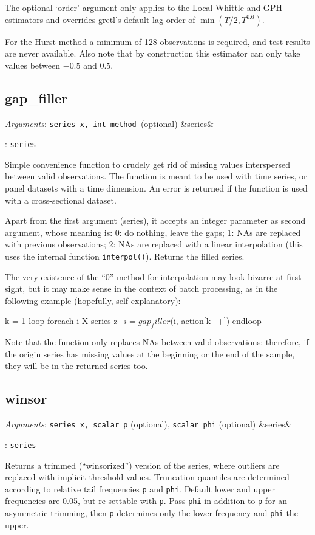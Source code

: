 \documentclass[11pt,english]{article}
\newcommand{\ArgRet}[2]{%
  {\it Arguments}: {#1}%
  \ifx&#2&%
  \else
  \par\smallskip\noindent {\it Return type}: \texttt{#2}
  \fi%
  \par\medskip\par%
  }
\begin{document}
The optional `order' argument only applies to the Local Whittle and GPH
estimators and overrides gretl's default lag order of $\min(T/2, T^{0.6})$.

For the Hurst method a minimum of 128 observations is required, and
test results are never available. Also note that by construction this
estimator can only take values between $-0.5$ and $0.5$.

\subsection{gap\_filler}

\ArgRet{\texttt{series x, int method }(optional)}{series}

Simple convenience function to crudely get rid of missing values
interspersed between valid observations. The function is meant to be
used with time series, or panel datasets with a time dimension. An
error is returned if the function is used with a cross-sectional
dataset.

Apart from the first argument (series), it accepts an integer
parameter as second argument, whose meaning is: 0: do nothing, leave
the gaps; 1: NAs are replaced with previous observations; 2: NAs are
replaced with a linear interpolation (this uses the internal function
\texttt{interpol()}). Returns the filled series.

The very existence of the ``0'' method for interpolation may look
bizarre at first sight, but it may make sense in the context of batch
processing, as in the following example (hopefully, self-explanatory):
\begin{code}
k = 1
loop foreach i X
   series z_$i = gap_filler($i, action[k++])
endloop
\end{code}

Note that the function only replaces NAs between valid observations;
therefore, if the origin series has missing values at the beginning or
the end of the sample, they will be in the returned series too.

\subsection{winsor}

\ArgRet{\texttt{series x, scalar p} (optional), \texttt{scalar
phi} (optional)}{series}

Returns a trimmed (``winsorized'') version
of the series, where outliers are replaced with implicit threshold
values. Truncation quantiles are determined according to relative
tail frequencies \texttt{p} and \texttt{phi}. Default lower and upper
frequencies are 0.05, but re-settable with \texttt{p}. Pass \texttt{phi}
in addition to \texttt{p} for an asymmetric trimming, then \texttt{p}
determines only the lower frequency and \texttt{phi} the upper.
\end{document}
